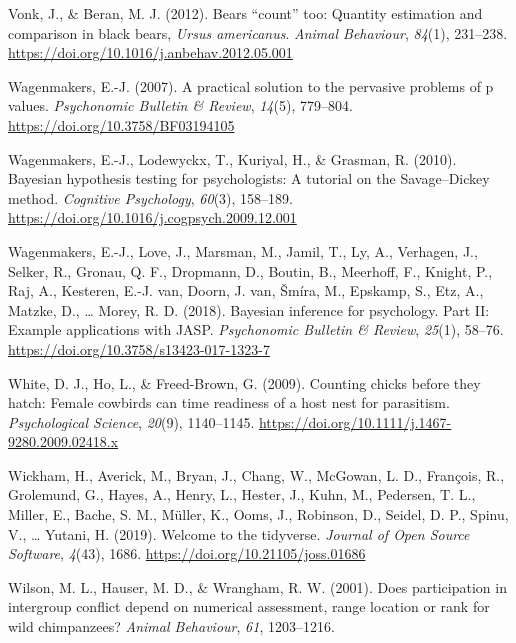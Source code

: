 \documentclass[
  ,pub,floatsintext]{apa6}
\newlength{\cslhangindent}
\newlength{\cslentryspacingunit} %
\newenvironment{CSLReferences}[2] %
 {%
  \setlength{\parindent}{0pt}
  \ifodd #1
  \let\oldpar\par
  \def\par{\hangindent=\cslhangindent\oldpar}
  \fi
  \setlength{\parskip}{#2\cslentryspacingunit}
 }%
 {}
\begin{document}
\begin{CSLReferences}{1}{0}
\leavevmode{}%
Vonk, J., \& Beran, M. J. (2012). Bears {``count''} too: Quantity estimation and comparison in black bears, \emph{{Ursus} americanus}. \emph{Animal Behaviour}, \emph{84}(1), 231--238. \url{https://doi.org/10.1016/j.anbehav.2012.05.001}

\leavevmode{}%
Wagenmakers, E.-J. (2007). A practical solution to the pervasive problems of p values. \emph{Psychonomic Bulletin \& Review}, \emph{14}(5), 779--804. \url{https://doi.org/10.3758/BF03194105}

\leavevmode{}%
Wagenmakers, E.-J., Lodewyckx, T., Kuriyal, H., \& Grasman, R. (2010). Bayesian hypothesis testing for psychologists: {A} tutorial on the {Savage}--{Dickey} method. \emph{Cognitive Psychology}, \emph{60}(3), 158--189. \url{https://doi.org/10.1016/j.cogpsych.2009.12.001}

\leavevmode{}%
Wagenmakers, E.-J., Love, J., Marsman, M., Jamil, T., Ly, A., Verhagen, J., Selker, R., Gronau, Q. F., Dropmann, D., Boutin, B., Meerhoff, F., Knight, P., Raj, A., Kesteren, E.-J. van, Doorn, J. van, Šmíra, M., Epskamp, S., Etz, A., Matzke, D., \ldots{} Morey, R. D. (2018). Bayesian inference for psychology. Part II: Example applications with JASP. \emph{Psychonomic Bulletin \& Review}, \emph{25}(1), 58--76. \url{https://doi.org/10.3758/s13423-017-1323-7}

\leavevmode{}%
White, D. J., Ho, L., \& Freed-Brown, G. (2009). Counting chicks before they hatch: {Female} cowbirds can time readiness of a host nest for parasitism. \emph{Psychological Science}, \emph{20}(9), 1140--1145. \url{https://doi.org/10.1111/j.1467-9280.2009.02418.x}

\leavevmode{}%
Wickham, H., Averick, M., Bryan, J., Chang, W., McGowan, L. D., François, R., Grolemund, G., Hayes, A., Henry, L., Hester, J., Kuhn, M., Pedersen, T. L., Miller, E., Bache, S. M., Müller, K., Ooms, J., Robinson, D., Seidel, D. P., Spinu, V., \ldots{} Yutani, H. (2019). Welcome to the {tidyverse}. \emph{Journal of Open Source Software}, \emph{4}(43), 1686. \url{https://doi.org/10.21105/joss.01686}

\leavevmode{}%
Wilson, M. L., Hauser, M. D., \& Wrangham, R. W. (2001). Does participation in intergroup conflict depend on numerical assessment, range location or rank for wild chimpanzees? \emph{Animal Behaviour}, \emph{61}, 1203--1216.


\end{CSLReferences}
\end{document}
